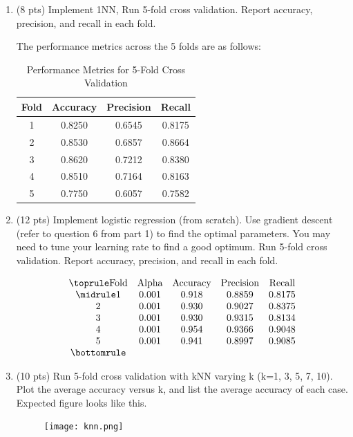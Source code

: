 \documentclass[a4paper]{article}
\theoremstyle{definition}
\newenvironment{soln}{
    \leavevmode\color{blue}\ignorespaces
}{}
\begin{document}
\begin{enumerate}
	\item (8 pts) Implement 1NN, Run 5-fold cross validation. Report accuracy, precision, and recall in each fold.
	
	\begin{soln}  The performance metrics across the 5 folds are as follows:

		\begin{table}[h]
			\centering
			\begin{tabular}{cccc}
				\toprule
				Fold & Accuracy & Precision & Recall \\
				\midrule
				1 & 0.8250 & 0.6545 & 0.8175 \\
				2 & 0.8530 & 0.6857 & 0.8664 \\
				3 & 0.8620 & 0.7212 & 0.8380 \\
				4 & 0.8510 & 0.7164 & 0.8163 \\
				5 & 0.7750 & 0.6057 & 0.7582 \\
				\bottomrule
			\end{tabular}
			\caption{Performance Metrics for 5-Fold Cross Validation}
			\label{tab:results}
		\end{table}
	\end{soln}
	
	\item (12 pts) Implement logistic regression (from scratch). Use gradient descent (refer to question 6 from part 1) to find the optimal parameters. You may need to tune your learning rate to find a good optimum. Run 5-fold cross validation. Report accuracy, precision, and recall in each fold.
	
	\begin{soln}  \[
		\begin{array}{ccccc}
		\toprule
		\text{Fold} & \text{Alpha} & \text{Accuracy} & \text{Precision} & \text{Recall} \\
		\midrule
		1 & 0.001 & 0.918 & 0.8859 & 0.8175 \\
		2 & 0.001 & 0.930 & 0.9027 & 0.8375 \\
		3 & 0.001 & 0.930 & 0.9315 & 0.8134 \\
		4 & 0.001 & 0.954 & 0.9366 & 0.9048 \\
		5 & 0.001 & 0.941 & 0.8997 & 0.9085 \\
		\bottomrule
		\end{array}
		\]
	\end{soln}
	
	\item (10 pts) Run 5-fold cross validation with kNN varying k (k=1, 3, 5, 7, 10). Plot the average accuracy versus k, and list the average accuracy of each case. \\
	Expected figure looks like this.
	\begin{figure}[h]
		\centering
		\texttt{[image: knn.png]}
	\end{figure}
	

\end{enumerate}
\end{document}
